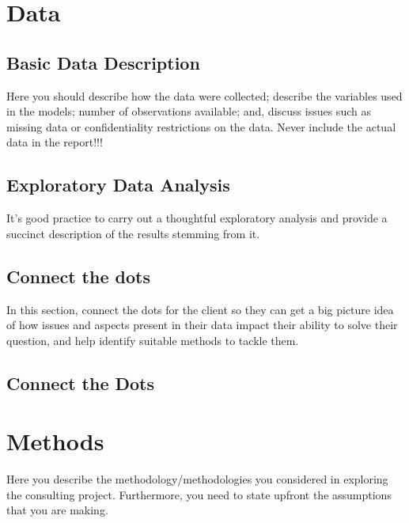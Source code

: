 \documentclass[
  letterpaper,
]{report}
\begin{document}
\hypertarget{data}{%
\section{Data}\label{data}}

\hypertarget{basic-data-description}{%
\subsection{Basic Data Description}\label{basic-data-description}}

Here you should describe how the data were collected; describe the
variables used in the models; number of observations available; and,
discuss issues such as missing data or confidentiality restrictions on
the data. Never include the actual data in the report!!!

\hypertarget{exploratory-data-analysis}{%
\subsection{Exploratory Data Analysis}\label{exploratory-data-analysis}}

It's good practice to carry out a thoughtful exploratory analysis and
provide a succinct description of the results stemming from it.

\hypertarget{connect-the-dots}{%
\subsection{Connect the dots}\label{connect-the-dots}}

In this section, connect the dots for the client so they can get a big
picture idea of how issues and aspects present in their data impact
their ability to solve their question, and help identify suitable
methods to tackle them.

\hypertarget{connect-the-dots-1}{%
\subsection{Connect the Dots}\label{connect-the-dots-1}}

\hypertarget{methods}{%
\section{Methods}\label{methods}}

Here you describe the methodology/methodologies you considered in
exploring the consulting project. Furthermore, you need to state upfront
the assumptions that you are making.
\end{document}

